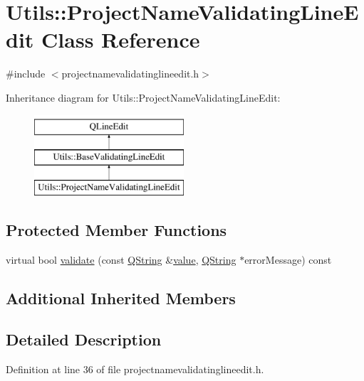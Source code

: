 \hypertarget{class_utils_1_1_project_name_validating_line_edit}{\section{Utils\-:\-:Project\-Name\-Validating\-Line\-Edit Class Reference}
\label{class_utils_1_1_project_name_validating_line_edit}
}


{\ttfamily \#include $<$projectnamevalidatinglineedit.\-h$>$}

Inheritance diagram for Utils\-:\-:Project\-Name\-Validating\-Line\-Edit\-:\begin{figure}[H]
\begin{center}
\leavevmode
\includegraphics[height=3.000000cm]{class_utils_1_1_project_name_validating_line_edit}
\end{center}
\end{figure}
\subsection*{Protected Member Functions}
\begin{DoxyCompactItemize}
\item 
virtual bool \hyperlink{class_utils_1_1_project_name_validating_line_edit_a165faa03d37c30304d0049eb57513988}{validate} (const \hyperlink{group___u_a_v_objects_plugin_gab9d252f49c333c94a72f97ce3105a32d}{Q\-String} \&\hyperlink{glext_8h_aa0e2e9cea7f208d28acda0480144beb0}{value}, \hyperlink{group___u_a_v_objects_plugin_gab9d252f49c333c94a72f97ce3105a32d}{Q\-String} $\ast$error\-Message) const 
\end{DoxyCompactItemize}
\subsection*{Additional Inherited Members}


\subsection{Detailed Description}


Definition at line 36 of file projectnamevalidatinglineedit.\-h.



